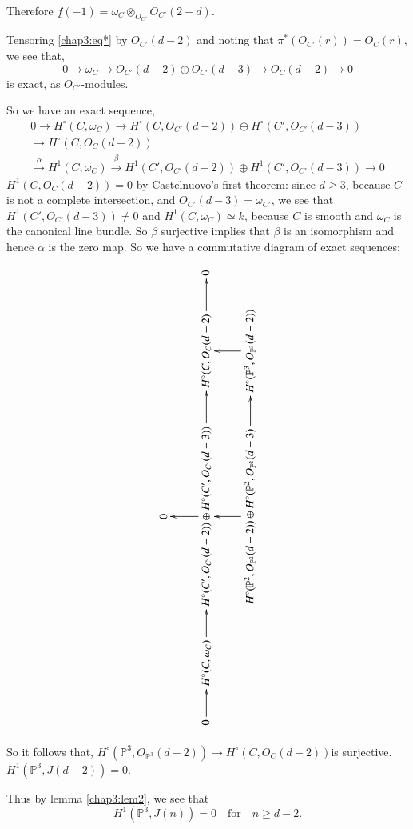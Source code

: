 Therefore $\underline{f}(-1)=\omega_C\otimes_{O_{C'}}O_{C'}(2-d)$.

\noindent Tensoring \eqref{chap3:eq*} by $O_{C'}(d-2)$ and noting that
$\pi^*(O_{C'}(r))=O_C(r)$, we see that,
$$
0\longrightarrow\omega_C\longrightarrow O_{C'}(d-2)\oplus O_{C'}(d-3)
\longrightarrow O_C(d-2)\longrightarrow 0
$$
is exact, as $O_{C'}$-modules.

\noindent So we have an exact sequence,
\begin{gather*}
0\longrightarrow H^\circ(C,\omega_C)\longrightarrow
H^\circ(C,O_{C'}(d-2))\oplus H^\circ(C',O_{C'}(d-3))\\
\longrightarrow H^\circ (C,O_C(d-2))\\
\xrightarrow{\alpha}H^1(C,\omega_C)\xrightarrow{\beta}H^1(C',O_{C'}
(d-2)) \oplus H^1(C',O_{C'}(d-3))\longrightarrow 0
\end{gather*}
$H^1(C,O_C(d-2))=0$ by Castelnuovo's first theorem: since $d\geq 3$,
because $C$ is not a complete intersection, and
$O_{C'}(d-3)=\omega_{C'}$, we see that $H^1(C',O_{C'}(d-3))\neq 0$ and
$H^1(C,\omega_C)\simeq k$, because $C$ is smooth and $\omega_C$ is the
canonical line bundle. So $\beta$ surjective implies that $\beta$ is
an isomorphism and hence $\alpha$ is the zero map. So we have a
commutative diagram of exact sequences:

\newpage



\[
\rotatebox{90}{
\xymatrix{
& & 0 & &\\
0 \ar[r] & H^\circ(C,\omega_C) \ar[r] &
H^\circ(C',O_{C'}(d-2))\oplus H^\circ(C',O_{C'}(d-3))\ar[u] \ar[r] &
H^\circ(C,O_C(d-2) \ar[r] & 0\\
& & H^\circ(\mathbb{P}^2,O_{\mathbb{P}^2}(d-2))\oplus\ar[u]H^\circ
(\mathbb{P}^2,O_{\mathbb{P}^2}(d-3)\ar[r] & H^\circ(\mathbb{P}^3,
O_{\mathbb{P}^3} (d-2)) \ar[u]&
}}
\]

\newpage


So it follows that, $H^\circ(\mathbb{P}^3,O_{\mathbb{P}^3}(d-2))
\longrightarrow H^\circ(C,O_C(d-2))$\pageoriginale is surjective. \ie
$H^1(\mathbb{P}^3,J(d-2))=0$. 

\noindent Thus by lemma \ref{chap3:lem2}, we see that 
$$
H^1(\mathbb{P}^3,J(n))=0\quad\text{for}\quad n\geq d-2.
$$

